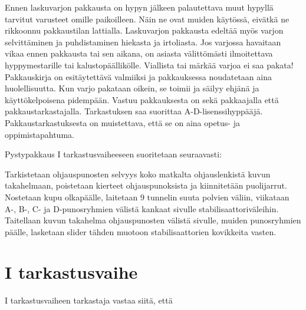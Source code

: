 
Ennen laskuvarjon pakkausta on hypyn jälkeen palautettava muut hypyllä tarvitut varusteet omille paikoilleen. Näin ne ovat muiden käytössä, eivätkä ne rikkoonnu pakkaustilan lattialla. Laskuvarjon pakkausta edeltää myös varjon selvittäminen ja puhdistaminen hiekasta ja irtoliasta. Jos varjossa havaitaan vikaa ennen pakkausta tai sen aikana, on asiasta välittömästi ilmoitettava hyppymestarille tai kalustopäällikölle. Viallista tai märkää varjoa ei saa pakata! Pakkauskirja on esitäytettävä valmiiksi ja pakkauksessa noudatetaan aina huolellisuutta. Kun varjo pakataan oikein, se toimii ja säilyy ehjänä ja käyttökelpoisena pidempään. Vastuu pakkauksesta on sekä pakkaajalla että pakkaustarkastajalla. Tarkastuksen saa suorittaa A-D-lisenssihyppääjä. Pakkaustarkastuksesta on muistettava, että se on aina opetus- ja oppimistapahtuma. 


Pystypakkaus I tarkastusvaiheeseen suoritetaan seuraavasti: 


Tarkistetaan ohjauspunosten selvyys koko matkalta ohjauslenkistä kuvun takahelmaan, poistetaan kierteet ohjauspunoksista ja kiinnitetään puolijarrut. Nostetaan kupu olkapäälle, laitetaan 9 tunnelin suuta polvien väliin, viikataan A\mbox{-,} B\mbox{-,} C- ja D-punosryhmien välistä kankaat sivulle stabilisaattoriväleihin. Taitellaan kuvun takahelma ohjauspunosten välistä sivulle, muiden punosryhmien päälle, lasketaan slider tähden muotoon stabilisaattorien kovikkeita vasten. 

\section{ I tarkastusvaihe }
\label{pakkaustarkastus-i-tarkastusvaihe}


I tarkastusvaiheen tarkastaja vastaa siitä, että 

